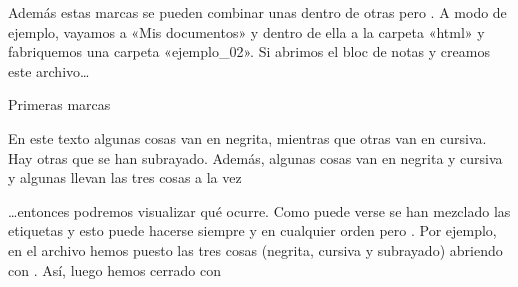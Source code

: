 \documentclass[a4paper,12pt,spanish]{sphinxmanual}
\begin{document}
Además estas marcas se pueden combinar unas dentro de otras pero . A modo de ejemplo, vayamos a «Mis documentos» y dentro de ella a la carpeta «html» y fabriquemos una carpeta «ejemplo\_02». Si abrimos el bloc de notas y creamos este archivo…

%
\begin{sphinxVerbatim}[commandchars=\\\{\}]
    Primeras marcas

En este texto algunas cosas van en negrita,
mientras que otras van en cursiva. Hay otras que
se han subrayado. Además, algunas cosas
van en negrita y cursiva y algunas
llevan las tres cosas a la vez
\end{sphinxVerbatim}

…entonces podremos visualizar qué ocurre. Como puede verse se han mezclado las etiquetas y esto puede hacerse siempre y en cualquier orden pero . Por ejemplo, en el archivo hemos puesto las tres cosas (negrita, cursiva y subrayado) abriendo con . Así, luego hemos cerrado con 
\end{document}
